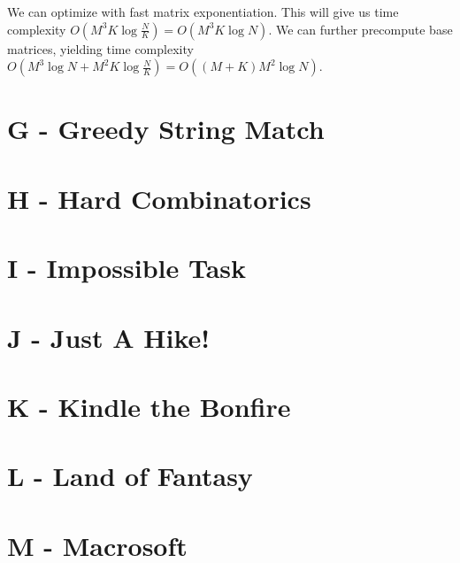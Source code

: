 \documentclass{article}
\begin{document}
We can optimize with fast matrix exponentiation. This will give us time complexity $O(M^3 K \log{\frac{N}{K}}) = O(M^3 K \log{N})$. We can further precompute base matrices, yielding time complexity $O(M^3 \log{N} + M^2 K \log{\frac{N}{K}}) = O((M+K) M^2 \log{N})$. 

\section{G - Greedy String Match}



\section{H - Hard Combinatorics}



\section{I - Impossible Task}



\section{J - Just A Hike!}



\section{K - Kindle the Bonfire}



\section{L - Land of Fantasy}



\section{M - Macrosoft}
\end{document}
